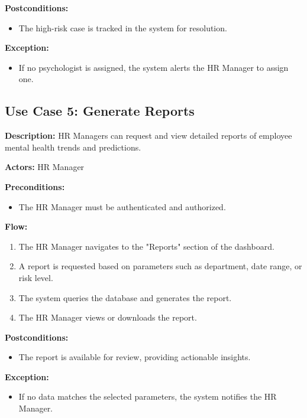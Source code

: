 \documentclass[conference]{IEEEtran}
\begin{document}
        \textbf{Postconditions:}
        \begin{itemize}
            \item The high-risk case is tracked in the system for resolution.
        \end{itemize}
        
        \textbf{Exception:}
        \begin{itemize}
            \item If no psychologist is assigned, the system alerts the HR Manager to assign one.
        \end{itemize}
        
        \subsection{Use Case 5: Generate Reports}
        
        \textbf{Description:} HR Managers can request and view detailed reports of employee mental health trends and predictions.
        
        \textbf{Actors:} HR Manager
        
        \textbf{Preconditions:}
        \begin{itemize}
            \item The HR Manager must be authenticated and authorized.
        \end{itemize}
        
        \textbf{Flow:}
        \begin{enumerate}
            \item The HR Manager navigates to the "Reports" section of the dashboard.
            \item A report is requested based on parameters such as department, date range, or risk level.
            \item The system queries the database and generates the report.
            \item The HR Manager views or downloads the report.
        \end{enumerate}
        
        \textbf{Postconditions:}
        \begin{itemize}
            \item The report is available for review, providing actionable insights.
        \end{itemize}
        
        \textbf{Exception:}
        \begin{itemize}
            \item If no data matches the selected parameters, the system notifies the HR Manager.
        \end{itemize}
        

    
\end{document}
